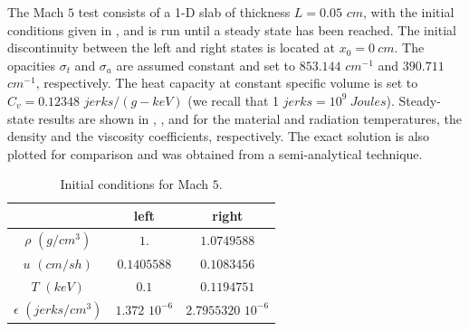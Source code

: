 \documentclass{mc2015}
\begin{document}
%
The Mach $5$ test consists of a 1-D slab of thickness $L=0.05$ $cm$, with the initial conditions given in , and is run until a steady state has been reached. The initial discontinuity between the left and right states is located at $x_0 = 0  \ cm$. The opacities $\sigma_t$ and $\sigma_a$ are assumed constant and set to $853.144$ $cm^{-1}$ and $390.711$ $cm^{-1}$, respectively. The heat capacity at constant specific volume is set to $C_v = 0.12348$ $jerks/(g-keV)$ (we recall that 1 $jerks = 10^9\ Joules$). Steady-state results are shown in , , and  for the material and radiation temperatures, the density and the viscosity coefficients, respectively. The exact solution is also plotted for comparison and was obtained from a semi-analytical technique.
%
\begin{table}[H]
\caption{\label{tbl:table6} Initial conditions for Mach $5$.}
\begin{center}
\begin{tabular}{|c|c|c|}
\hline 
 & left  & right \\ \hline
$\rho$ $(g/cm^3)$ &$1.$ & $1.0749588$ \\ \hline
$u$ $(cm/sh)$& $0.1405588$ & $0.1083456$ \\ \hline
$T$ $(keV)$& $0.1$ & $0.1194751$\\ \hline
$\epsilon$ $(jerks/cm^3)$ & $1.372$ $10^{-6}$ & $2.7955320$ $10^{-6}$\\
\hline
\end{tabular}  
\end{center}  
\end{table}
%
\end{document}
